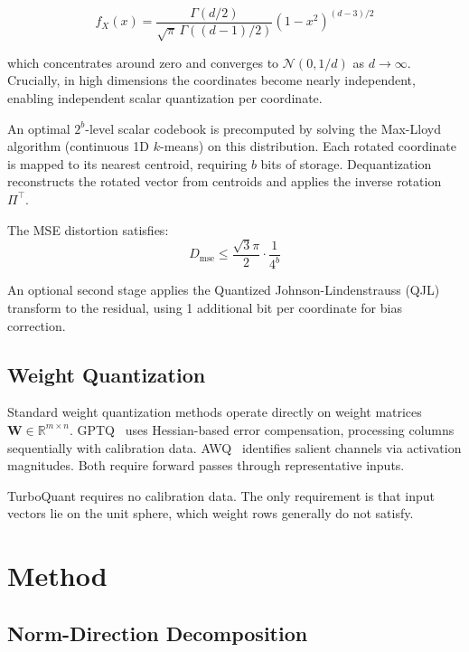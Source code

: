 \documentclass[11pt,twocolumn,letterpaper]{article}
\begin{document}
\begin{equation}
f_X(x) = \frac{\Gamma(d/2)}{\sqrt{\pi}\,\Gamma((d-1)/2)}(1 - x^2)^{(d-3)/2}
\end{equation}

which concentrates around zero and converges to $\mathcal{N}(0, 1/d)$ as $d \to \infty$. Crucially, in high dimensions the coordinates become nearly independent, enabling independent scalar quantization per coordinate.

An optimal $2^b$-level scalar codebook is precomputed by solving the Max-Lloyd algorithm (continuous 1D $k$-means) on this distribution. Each rotated coordinate is mapped to its nearest centroid, requiring $b$ bits of storage. Dequantization reconstructs the rotated vector from centroids and applies the inverse rotation $\Pi^\top$.

The MSE distortion satisfies:
\begin{equation}
D_{\text{mse}} \leq \frac{\sqrt{3}\pi}{2} \cdot \frac{1}{4^b}
\end{equation}

An optional second stage applies the Quantized Johnson-Lindenstrauss (QJL) transform to the residual, using 1 additional bit per coordinate for bias correction.

\subsection{Weight Quantization}

Standard weight quantization methods operate directly on weight matrices $\mathbf{W} \in \mathbb{R}^{m \times n}$. GPTQ~\cite{frantar2022gptq} uses Hessian-based error compensation, processing columns sequentially with calibration data. AWQ~\cite{lin2023awq} identifies salient channels via activation magnitudes. Both require forward passes through representative inputs.

TurboQuant requires no calibration data. The only requirement is that input vectors lie on the unit sphere, which weight rows generally do not satisfy.

\section{Method}

\subsection{Norm-Direction Decomposition}
\end{document}
